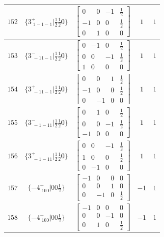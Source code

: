 \documentclass[fleqn,8pt]{jsarticle}
\begin{document}
\begin{longtable}{ccccc}
$ 152 $ & $ \{3^{+}_{\,\,1-1-1}|\frac{1}{2} \frac{1}{2} 0\} $ & $ \begin{bmatrix} 0 & 0 & -1 & \frac{1}{2} \\ -1 & 0 & 0 & \frac{1}{2} \\ 0 & 1 & 0 & 0 \end{bmatrix} $ & $ 1 $ & $ 1 $ \\ \hline
$ 153 $ & $ \{3^{-}_{\,\,-11-1}|\frac{1}{2} \frac{1}{2} 0\} $ & $ \begin{bmatrix} 0 & -1 & 0 & \frac{1}{2} \\ 0 & 0 & -1 & \frac{1}{2} \\ 1 & 0 & 0 & 0 \end{bmatrix} $ & $ 1 $ & $ 1 $ \\ \hline
$ 154 $ & $ \{3^{+}_{\,\,-11-1}|\frac{1}{2} \frac{1}{2} 0\} $ & $ \begin{bmatrix} 0 & 0 & 1 & \frac{1}{2} \\ -1 & 0 & 0 & \frac{1}{2} \\ 0 & -1 & 0 & 0 \end{bmatrix} $ & $ 1 $ & $ 1 $ \\ \hline
$ 155 $ & $ \{3^{-}_{\,\,-1-11}|\frac{1}{2} \frac{1}{2} 0\} $ & $ \begin{bmatrix} 0 & 1 & 0 & \frac{1}{2} \\ 0 & 0 & -1 & \frac{1}{2} \\ -1 & 0 & 0 & 0 \end{bmatrix} $ & $ 1 $ & $ 1 $ \\ \hline
$ 156 $ & $ \{3^{+}_{\,\,-1-11}|\frac{1}{2} \frac{1}{2} 0\} $ & $ \begin{bmatrix} 0 & 0 & -1 & \frac{1}{2} \\ 1 & 0 & 0 & \frac{1}{2} \\ 0 & -1 & 0 & 0 \end{bmatrix} $ & $ 1 $ & $ 1 $ \\ \hline
$ 157 $ & $ \{-4^{+}_{\,\,100}|0 0 \frac{1}{2}\} $ & $ \begin{bmatrix} -1 & 0 & 0 & 0 \\ 0 & 0 & 1 & 0 \\ 0 & -1 & 0 & \frac{1}{2} \end{bmatrix} $ & $ -1 $ & $ 1 $ \\ \hline
$ 158 $ & $ \{-4^{-}_{\,\,100}|0 0 \frac{1}{2}\} $ & $ \begin{bmatrix} -1 & 0 & 0 & 0 \\ 0 & 0 & -1 & 0 \\ 0 & 1 & 0 & \frac{1}{2} \end{bmatrix} $ & $ -1 $ & $ 1 $ \\ \hline

\end{longtable}
\end{document}
